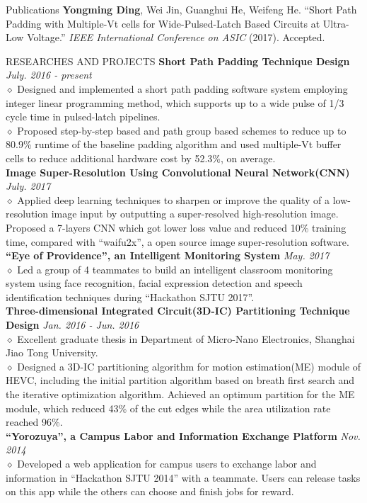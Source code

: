 \documentclass{resume} %
\begin{document}
\begin{rSection}{Publications}
\textbf{Yongming Ding}, Wei Jin, Guanghui He, Weifeng He. ``Short Path Padding with Multiple-Vt cells for Wide-Pulsed-Latch Based Circuits at Ultra-Low Voltage.'' \emph{IEEE International Conference on ASIC}  (2017). Accepted.
\end{rSection}

\begin{rSection}{RESEARCHES AND PROJECTS}
\textbf{Short Path Padding Technique Design} \hfill \emph{July. 2016 - present}
\\$\diamond$ Designed and implemented a short path padding software system employing integer linear programming method, which supports up to a wide pulse of 1/3 cycle time in pulsed-latch pipelines.
\\$\diamond$ Proposed step-by-step based and path group based schemes to reduce up to 80.9\% runtime of the baseline padding algorithm and used multiple-Vt buffer cells to reduce additional hardware cost by 52.3\%, on average. 
\\\textbf{Image Super-Resolution Using Convolutional Neural Network(CNN)} \hfill \emph{July. 2017}
\\$\diamond$  Applied deep learning techniques to sharpen or improve the quality of a low-resolution image input by outputting a super-resolved high-resolution image. Proposed a 7-layers CNN which got lower loss value and reduced 10\% training time, compared with ``waifu2x'', a open source image super-resolution software.
\\\textbf{``Eye of Providence'', an Intelligent Monitoring System} \hfill \emph{May. 2017}
\\$\diamond$ Led a group of 4 teammates to build an intelligent classroom monitoring system using face recognition, facial expression detection and speech identification techniques during ``Hackathon SJTU 2017''.
\\\textbf{Three-dimensional Integrated Circuit(3D-IC) Partitioning Technique Design} \hfill \emph{Jan. 2016 - Jun. 2016}
\\$\diamond$ Excellent graduate thesis in Department of Micro-Nano Electronics, Shanghai Jiao Tong University.
\\$\diamond$ Designed a 3D-IC partitioning algorithm for motion estimation(ME) module of HEVC, including the initial partition algorithm based on breath first search and the iterative optimization algorithm. Achieved an optimum partition for the ME module, which reduced 43\% of the cut edges while the area utilization rate reached 96\%.
\\\textbf{``Yorozuya'', a Campus Labor and Information Exchange Platform} \hfill \emph{Nov. 2014}
\\$\diamond$  Developed a web application for campus users to exchange labor and information in ``Hackathon SJTU 2014'' with a teammate. Users can release tasks on this app while the others can choose and finish jobs for reward.
\end{rSection}
\end{document}
